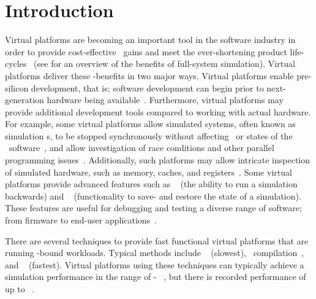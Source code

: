 
\chapter{Introduction}
\label{cha:introduction}
Virtual platforms are becoming an important tool in the software industry in order to provide cost-effective \dvttermttm\ gains and meet the ever-shortening product life-cycles~ (see  for an overview of the benefits of full-system simulation).
Virtual platforms deliver these \dvttermttm -benefits in two major ways.
Virtual platforms enable pre-silicon development, that is; software development can begin prior to next-generation hardware being available~.
Furthermore, virtual platforms may provide additional development tools compared to working with actual hardware.
For example, some virtual platforms allow simulated systems, often known as simulation \dvttermtarget s, to be stopped synchronously without affecting \dvttermtiming\ or states of the \dvttermtarget\ software~, and allow investigation of race conditions and other parallel programming issues~.
Additionally, such platforms may allow intricate inspection of simulated hardware, such as memory, caches, and registers~.
Some virtual platforms provide advanced features such as \dvttermreverseexecution ~ (the ability to run a simulation backwards) and \dvttermcheckpointing ~ (functionality to save- and restore the state of a simulation).
These features are useful for debugging and testing a diverse range of software; from firmware to end-user applications~.

There are several techniques to provide fast functional virtual platforms that are running \dvttermcpu -bound workloads.
Typical methods include \dvtterminterpretation ~ (slowest), \dvttermjit\ compilation~, and \dvttermdirectvirtualization ~ (fastest).
Virtual platforms using these techniques can typically achieve a simulation performance in the range of - \dvttermmipsecond ~, but there is recorded performance of up to  \dvttermmipsecond ~.

